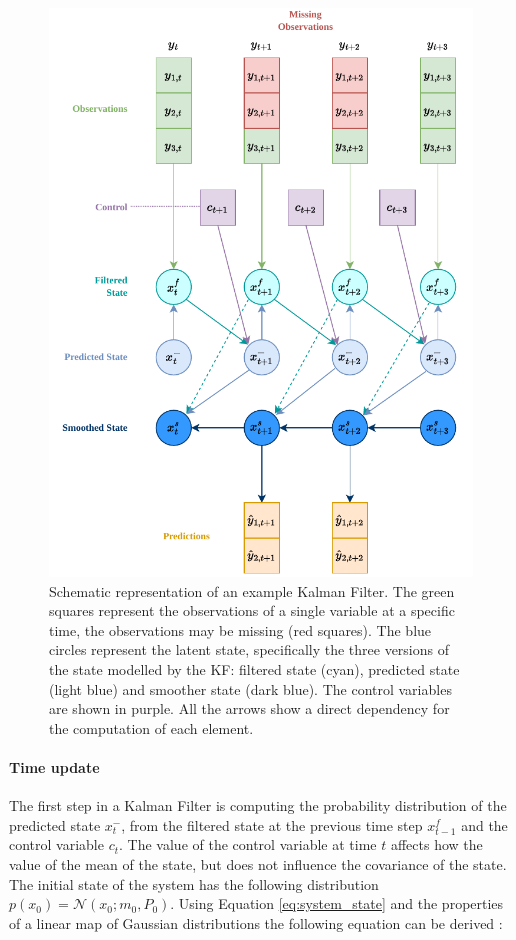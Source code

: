 \documentclass{article}
\newcommand{\norm}[3]{\mathcal{N}\left(#1; #2, #3\right)} %
\begin{document}
\begin{figure}
\centerline{\includegraphics[width=4.5in]{Kalman Filter figure}}
\caption{Schematic representation of an example Kalman Filter. The green squares represent the observations of a single variable at a specific time, the observations may be missing (red squares). The blue circles represent the latent state, specifically the three versions of the state modelled by the KF: filtered state (cyan), predicted state (light blue) and smoother state (dark blue). The control variables are shown in purple.
All the arrows show a direct dependency for the computation of each element. 
}
\label{fig:kalman_filter}
\end{figure}

\paragraph{Time update}

The first step in a Kalman Filter is computing the probability distribution of the predicted state $x^-_t$, from the filtered state at the previous time step $x^f_{t-1}$ and the control variable $c_t$.
The value of the control variable at time $t$ affects how the value of the mean of the state, but does not influence the covariance of the state.
The initial state of the system has the following distribution $p(x_0) = \norm{x_0}{m_0}{P_0}$. Using Equation \ref{eq:system_state} and the properties of a linear map of Gaussian distributions the following equation can be derived \cite{bishop_pattern_2006, 2020_hennig_pml}:
\end{document}
